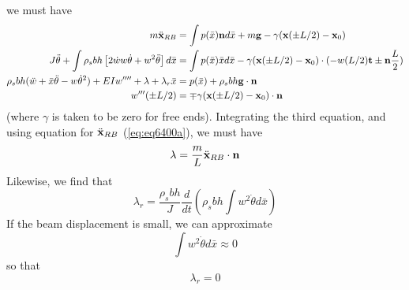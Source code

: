 \documentclass{article}
\begin{document}
we must have
\begin{subequations}
\label{equations2}
\begin{align}
\label{eq:eq6400a}
 m \ddot{\bf x}_{RB} &= \int p(\bar{x}){\bf n} d\bar{x} + m {\bf g} - \gamma({\bf x}(\pm L/2) - {\bf x}_0) \\
\label{eq:eq6400b}
 J \ddot{\theta} + \int \rho_s b h\left[2\dot{w}w\dot{\theta}+w^2\ddot{\theta}\right] d\bar{x}  &= \int p(\bar{x}) \bar{x} d\bar{x} - \gamma({\bf x}(\pm L/2) - {\bf x}_0)\cdot(-w(L/2){\bf t}\pm{\bf n}\frac{L}{2}) \\
\label{eq:eq6400c}
 \rho_s b h (\ddot{w} + \bar{x}\ddot{\theta}-w\dot{\theta}^2) + EIw'''' + \lambda + \lambda_r \bar{x} &= p(\bar{x}) + \rho_s b h {\bf g} \cdot {\bf n} \\
\label{eq:eq6400d}
 w'''(\pm L/2) &= \mp \gamma({\bf x}(\pm L/2) - {\bf x}_0) \cdot {\bf n} 
\end{align}
\end{subequations}
(where $\gamma$ is taken to be zero for free ends).
Integrating the third equation, and using equation for $\ddot{\bf x}_{RB}$ (\ref{eq:eq6400a}), we must have
\begin{equation} \lambda = \frac{m}{L} \ddot{\bf x}_{RB} \cdot {\bf n} \label{eq:eq6500} \end{equation}
Likewise, we find that
\begin{equation}  \lambda_r = \frac{\rho_s b h}{J} \frac{d}{dt}\left(\rho_s b h \int w^2 \dot{\theta} d\bar{x} \right)  \label{eq:eq6600} \end{equation}
If the beam displacement is small, we can approximate 
\[ \int w^2 \dot{\theta} d\bar{x} \approx 0 \]
so that
\[ \lambda_r = 0 \]
\end{document}
